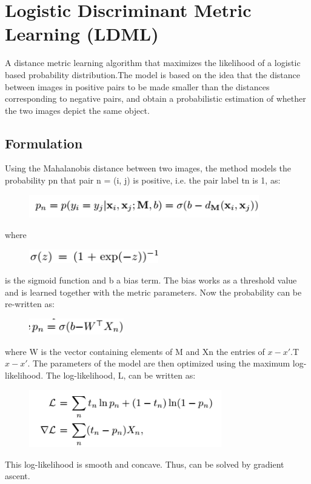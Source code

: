 \documentclass{article}
\begin{document}
\section{Logistic Discriminant Metric Learning (LDML)}\label{sec:ldml}
A distance metric learning algorithm that maximizes the likelihood of a logistic based probability distribution.The model is based on the idea that the distance between images in positive pairs to be made smaller than the distances corresponding to negative pairs, and obtain a probabilistic estimation of whether the two images depict the same object.
\subsection{Formulation}
Using the Mahalanobis distance between two images, the method models the probability pn that pair n = (i, j) is positive, i.e. the pair label tn is 1, as:
\begin{figure}[H]
    \centering
        \includegraphics[height=1cm]{./ldml_eq1.png}
\end{figure}
where 
\begin{figure}[H]
    \centering
    \includegraphics[height=0.6cm]{./ldml_eq2.png}
\end{figure}
is the sigmoid function and b a bias term. The bias works as a threshold value and is learned together with the metric parameters.
Now the probability can be re-written as:
\begin{figure}[H]
    \centering
    \includegraphics[height=0.7cm]{./ldml_eq3.png}
\end{figure}
where W is the vector containing elements of M and Xn the entries of \(x-x'\).T\(x-x'\).
The parameters of the model are then optimized using the  maximum log-likelihood. The log-likelihood, L, can be written as:
\begin{figure}[H]
    \centering
    \includegraphics[height=2.5cm]{./ldml_eq4.png}
\end{figure}
This log-likelihood is smooth and concave. Thus, can be solved by gradient ascent.
\end{document}
